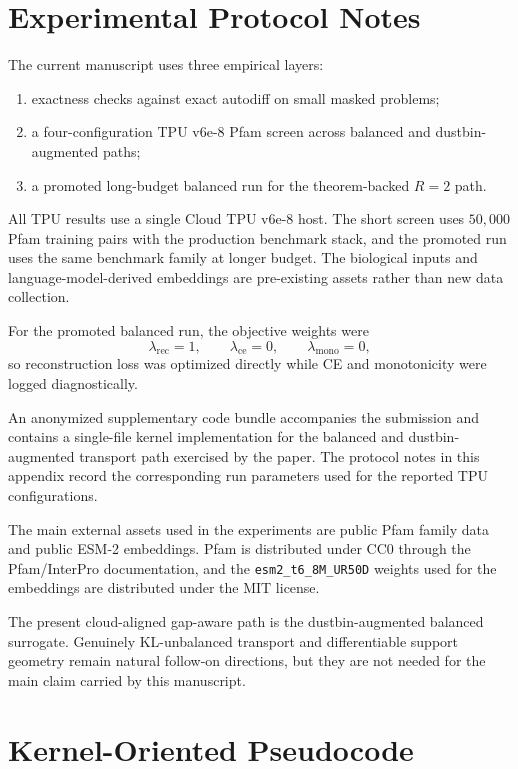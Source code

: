 \section{Experimental Protocol Notes}

The current manuscript uses three empirical layers:
\begin{enumerate}
    \item exactness checks against exact autodiff on small masked problems;
    \item a four-configuration TPU v6e-8 Pfam screen across balanced and dustbin-augmented paths;
    \item a promoted long-budget balanced run for the theorem-backed $R=2$ path.
\end{enumerate}

All TPU results use a single Cloud TPU v6e-8 host. The short screen uses $50{,}000$ Pfam training pairs with the production benchmark stack, and the promoted run uses the same benchmark family at longer budget. The biological inputs and language-model-derived embeddings are pre-existing assets rather than new data collection.

For the promoted balanced run, the objective weights were
\[
\lambda_{\mathrm{rec}}=1,\qquad \lambda_{\mathrm{ce}}=0,\qquad \lambda_{\mathrm{mono}}=0,
\]
so reconstruction loss was optimized directly while CE and monotonicity were logged diagnostically.

An anonymized supplementary code bundle accompanies the submission and contains a single-file kernel implementation for the balanced and dustbin-augmented transport path exercised by the paper. The protocol notes in this appendix record the corresponding run parameters used for the reported TPU configurations.

The main external assets used in the experiments are public Pfam family data and public ESM-2 embeddings. Pfam is distributed under CC0 through the Pfam/InterPro documentation, and the \texttt{esm2\_t6\_8M\_UR50D} weights used for the embeddings are distributed under the MIT license.

The present cloud-aligned gap-aware path is the dustbin-augmented balanced surrogate. Genuinely KL-unbalanced transport and differentiable support geometry remain natural follow-on directions, but they are not needed for the main claim carried by this manuscript.

\section{Kernel-Oriented Pseudocode}

